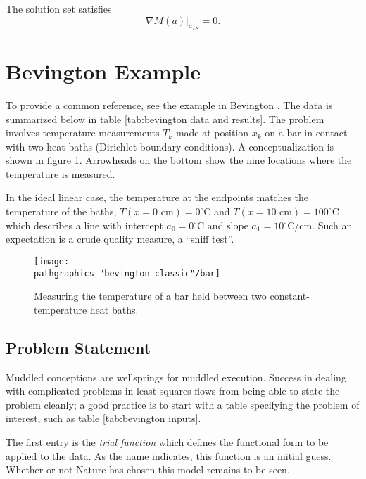 The solution set satisfies
  \begin{equation}   %
    \nabla M( a )|_{a_{LS}} = 0 .
    \label{eq:gradient lr}
  \end{equation}

\section{Bevington Example}  %

To provide a common reference, see the example in Bevington \cite[ch 6]{Bevington}. The data is summarized below in table \ref{tab:bevington data and results}. The problem involves temperature measurements $T_{k}$ made at position $x_{k}$ on a bar in contact with two heat baths (Dirichlet boundary conditions). A conceptualization is shown in figure \ref{fig:bar}. Arrowheads on the bottom show the nine locations where the temperature is measured.

In the ideal linear case, the temperature at the endpoints matches the temperature of the baths, $T(x=0 \text{ cm}) = 0^{\circ}$C and $T(x = 10 \text{ cm}) = 100^{\circ}$C which describes a line with intercept $a_{0} = 0^{\circ}$C and slope $a_{1} = 10^{\circ}$C/cm. Such an expectation is a crude quality measure, a ``sniff test''.

\begin{figure}[htbp] %
   \centering
   \texttt{[image: \\pathgraphics "bevington classic"/bar]} 
   \caption[Measuring the temperature of a bar.]{Measuring the temperature of a bar held between two constant-temperature heat baths.}
   \label{fig:bar}
\end{figure}

\subsection{Problem Statement}  %
Muddled conceptions are wellsprings for muddled execution. Success in dealing with complicated problems in least squares flows from being able to state the problem cleanly; a good practice is to start with a table specifying the problem of interest, such as table \ref{tab:bevington inputs}.

The first entry is the \emph{trial function} which defines the functional form to be applied to the data. As the name indicates, this function is an initial guess. Whether or not Nature has chosen this model remains to be seen.

